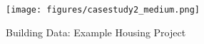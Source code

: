 \documentclass[12pt]{article}
\begin{document}

\begin{figure}[t!]
        \centering
        \caption[ Building Data: Example Housing Project]
        {\small Building Data: Example Housing Project } 
        \vspace{2mm}
\texttt{[image: figures/casestudy2\_medium.png]}
        \label{fig:bblumaps}
\end{figure} 

\end{document}
